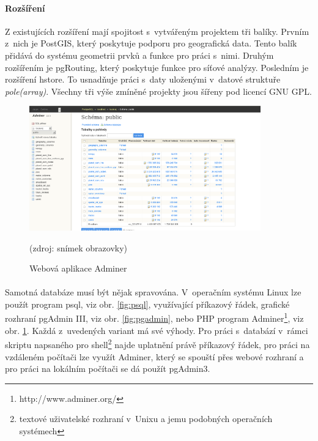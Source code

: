 \documentclass[11pt,a4paper,titlepage,oneside]{book}
\begin{document}
		\paragraph{Rozšíření}\label{par:rozsireni}Z existujících rozšíření mají spojitost s~vytvářeným projektem tři balíky. Prvním z~nich je PostGIS, který poskytuje podporu pro geografická data. Tento balík přidává do systému geometrii prvků a funkce pro práci s~nimi. Druhým rozšířením je pgRouting, který poskytuje funkce pro síťové analýzy. Posledním je rozšíření hstore. To usnadňuje práci s~daty uloženými v~datové struktuře \textit{pole(array)}. Všechny tři výše zmíněné projekty jsou šířeny pod licencí GNU \ac{GPL}.
		\begin{figure}[!h]
			\begin{center}
				\includegraphics[width=10cm]{obrazky/adminer.png}
				\caption{Webová aplikace Adminer}
				\label{fig:adminer}
				(zdroj: snímek obrazovky)
			\end{center}
		\end{figure}			


		\paragraph{}Samotná databáze musí být nějak spravována. V~operačním systému Linux lze použít program psql, viz obr. \ref{fig:psql}, využívající příkazový řádek, grafické rozhraní pgAdmin III, viz obr. \ref{fig:pgadmin}, nebo \ac{PHP} program Adminer\footnote{http://www.adminer.org/}, viz obr. \ref{fig:adminer}. Každá z~uvedených variant má své výhody. Pro práci s~databází v~rámci skriptu napsaného pro shell\footnote{textové uživatelské rozhraní v~Unixu a jemu podobných operačních systémech} najde uplatnění právě příkazový řádek, pro práci na vzdáleném počítači lze využít Adminer, který se spouští přes webové rozhraní a pro práci na lokálním počítači se dá použít pgAdmin3.
\end{document}
